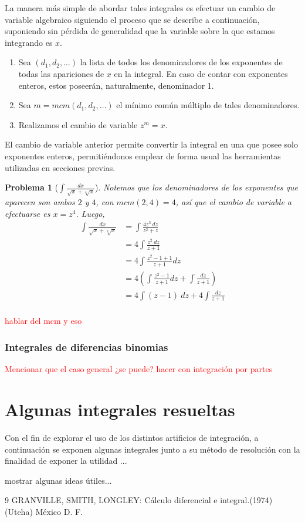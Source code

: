 \documentclass[paper=a4, fontsize=11pt]{scrartcl}
\numberwithin{equation}{subsection}
\numberwithin{figure}{subsection}
\numberwithin{table}{subsection}
\newtheorem{problema}{Problema}
\theoremstyle{definition}
\begin{document}
La manera más simple de abordar tales integrales es efectuar un cambio de variable algebraico siguiendo el proceso que se describe a continuación, suponiendo sin pérdida de generalidad que la variable sobre la que estamos integrando es $x$.
\begin{enumerate}
	\item Sea $(d_1,d_2,\ldots)$ la lista de todos los denominadores de los exponentes de todas las apariciones de $x$ en la integral. En caso de contar con exponentes enteros, estos poseerán, naturalmente, denominador 1.
	\item Sea $m=mcm(d_1,d_2,\ldots)$ el mínimo común múltiplo de tales denominadores.
	\item Realizamos el cambio de variable $z^m=x$.
\end{enumerate}
El cambio de variable anterior permite convertir la integral en una que posee solo exponentes enteros, permitiéndonos emplear de forma usual las herramientas utilizadas en secciones previas.
\begin{problema}[$\int \frac{dx}{\sqrt{x}+\sqrt[4]{x}}$]
	Notemos que los denominadores de los exponentes que aparecen son ambos $2$ y $4$, con $mcm(2,4)=4$, así que el cambio de variable a efectuarse es $x=z^4$. Luego,
	\begin{align*}
		\int \frac{dx}{\sqrt{x}+\sqrt[4]{x}}&=\int \frac{4z^3\:dz}{z^2+z}\\
									&=4\int \frac{z^2\:dz}{z+1}\\
									&=4\int \frac{z^2-1+1}{z+1}dz\\
									&=4\left(\int \frac{z^2-1}{z+1}dz+\int\frac{dz}{z+1}\right)\\
									&=4\int (z-1)\:dz+4\int\frac{dz}{z+1}\\
	\end{align*}
\end{problema}

\textcolor{red}{hablar del mcm y eso}
\subsubsection{Integrales de diferencias binomias}
\textcolor{red}{Mencionar que el caso general ¿se puede? hacer con integración por partes}
\newpage
\section{Algunas integrales resueltas}
Con el fin de explorar el uso de los distintos artificios de integración, a continuación se exponen algunas integrales junto a su método de resolución con la finalidad de exponer la utilidad ...

mostrar algunas ideas útiles...
\begin{thebibliography}{9}
	 GRANVILLE, SMITH, LONGLEY: Cálculo diferencial e integral.(1974) (Uteha) México D. F.

\end{thebibliography}
\end{document}

